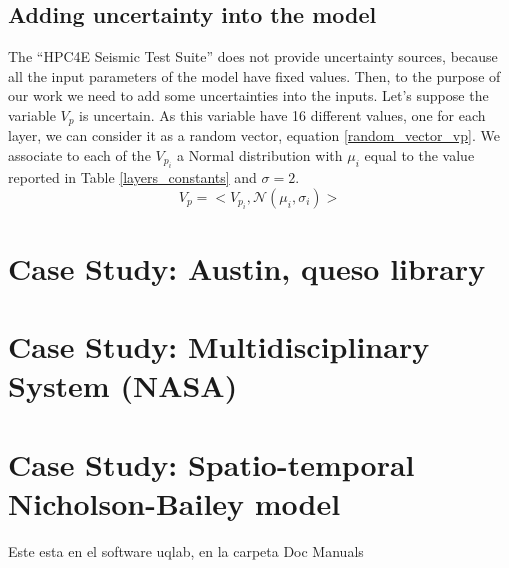 \subsection{Adding uncertainty into the model}

The “HPC4E Seismic Test Suite” does not provide uncertainty sources, because all the input parameters of the model have fixed values. Then, to the purpose of our work we need to add some uncertainties into the inputs. Let's suppose the variable ${V_{p}}$ is uncertain. As this variable have 16 different values, one for each layer, we can consider it as a random vector, equation \ref{random_vector_vp}. We associate to each of the $V_{{p}_{i}}$ a Normal distribution with ${\mu}_{i}$ equal to the value reported in Table \ref{layers_constants} and $\sigma=2$.
\begin{equation}\label{random_vector_vp}
V_{p}=<V_{{p}_{i}},\mathcal{N}({\mu}_{i},{\sigma}_{i})>
\end{equation}

\section{Case Study: Austin, queso library}\label{spatio_temporal}

\section{Case Study: Multidisciplinary System (NASA)}\label{NASA}

\section{Case Study: Spatio-temporal Nicholson-Bailey model}
Este esta en el software uqlab, en la carpeta Doc Manuals
